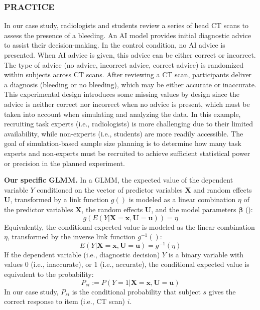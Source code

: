 \documentclass[
  man,
  floatsintext,
  longtable,
  a4paper,
  nolmodern,
  notxfonts,
  notimes,
  colorlinks=true,linkcolor=blue,citecolor=blue,urlcolor=blue]{apa7}
\begin{document}
\subsubsection{PRACTICE}\label{practice-1}

In our case study, radiologists and students review a series of head CT
scans to assess the presence of a bleeding. An AI model provides initial
diagnostic advice to assist their decision-making. In the control
condition, no AI advice is presented. When AI advice is given, this
advice can be either correct or incorrect. The type of advice (no
advice, incorrect advice, correct advice) is randomized within subjects
across CT scans. After reviewing a CT scan, participants deliver a
diagnosis (bleeding or no bleeding), which may be either accurate or
inaccurate. This experimental design introduces some missing values by
design since the advice is neither correct nor incorrect when no advice
is present, which must be taken into account when simulating and
analyzing the data. In this example, recruiting task experts (i.e.,
radiologists) is more challenging due to their limited availability,
while non-experts (i.e., students) are more readily accessible. The goal
of simulation-based sample size planning is to determine how many task
experts and non-experts must be recruited to achieve sufficient
statistical power or precision in the planned experiment.

\textbf{Our specific GLMM.} In a GLMM, the expected value of the
dependent variable \(Y\) conditioned on the vector of predictor
variables \(\mathbf{X}\) and random effects \(\mathbf{U}\), transformed
by a link function \(g()\) is modeled as a linear combination \(\eta\)
of the predictor variables \(\mathbf{X}\), the random effects
\(\mathbf{U}\), and the model parameters \(\mathbf{\beta}\)
(): \[
g(E(Y|\mathbf{X}=\mathbf{x},\mathbf{U}=\mathbf{u})) = \eta
\] Equivalently, the conditional expected value is modeled as the linear
combination \(\eta\), transformed by the inverse link function
\(g^{-1}()\): \[
E(Y|\mathbf{X}=\mathbf{x},\mathbf{U}=\mathbf{u}) = g^{-1}(\eta)
\] If the dependent variable (i.e., diagnostic decision) \(Y\) is a
binary variable with values \(0\) (i.e., inaccurate), or \(1\) (i.e.,
accurate), the conditional expected value is equivalent to the
probability: \[
P_{si} := P(Y = 1|\mathbf{X}=\mathbf{x},\mathbf{U}=\mathbf{u})
\] In our case study, \(P_{si}\) is the conditional probability that
subject \(s\) gives the correct response to item (i.e., CT scan) \(i\).
\end{document}
